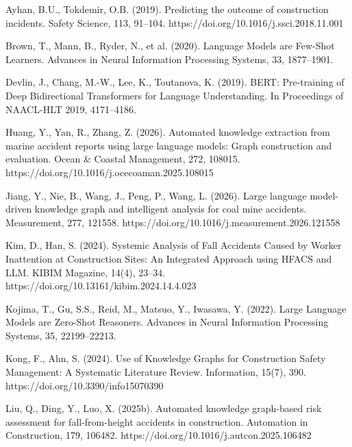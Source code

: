 \documentclass[11pt]{article}
\begin{document}
Ayhan, B.U., Tokdemir, O.B. (2019). Predicting the outcome of construction incidents. Safety Science, 113, 91--104. https:/\allowbreak{}/\allowbreak{}doi.\allowbreak{}org/\allowbreak{}10.\allowbreak{}1016/\allowbreak{}j.\allowbreak{}ssci.\allowbreak{}2018.\allowbreak{}11.\allowbreak{}001

Brown, T., Mann, B., Ryder, N., et al. (2020). Language Models are Few-Shot Learners. Advances in Neural Information Processing Systems, 33, 1877--1901.

Devlin, J., Chang, M.-W., Lee, K., Toutanova, K. (2019). BERT: Pre-training of Deep Bidirectional Transformers for Language Understanding. In Proceedings of NAACL-HLT 2019, 4171--4186.

Huang, Y., Yan, R., Zhang, Z. (2026). Automated knowledge extraction from marine accident reports using large language models: Graph construction and evaluation. Ocean \& Coastal Management, 272, 108015. https:/\allowbreak{}/\allowbreak{}doi.\allowbreak{}org/\allowbreak{}10.\allowbreak{}1016/\allowbreak{}j.\allowbreak{}ocecoaman.\allowbreak{}2025.\allowbreak{}108015

Jiang, Y., Nie, B., Wang, J., Peng, P., Wang, L. (2026). Large language model-driven knowledge graph and intelligent analysis for coal mine accidents. Measurement, 277, 121558. https:/\allowbreak{}/\allowbreak{}doi.\allowbreak{}org/\allowbreak{}10.\allowbreak{}1016/\allowbreak{}j.\allowbreak{}measurement.\allowbreak{}2026.\allowbreak{}121558

Kim, D., Han, S. (2024). Systemic Analysis of Fall Accidents Caused by Worker Inattention at Construction Sites: An Integrated Approach using HFACS and LLM. KIBIM Magazine, 14(4), 23--34. https:/\allowbreak{}/\allowbreak{}doi.\allowbreak{}org/\allowbreak{}10.\allowbreak{}13161/\allowbreak{}kibim.\allowbreak{}2024.\allowbreak{}14.\allowbreak{}4.\allowbreak{}023

Kojima, T., Gu, S.S., Reid, M., Matsuo, Y., Iwasawa, Y. (2022). Large Language Models are Zero-Shot Reasoners. Advances in Neural Information Processing Systems, 35, 22199--22213.

Kong, F., Ahn, S. (2024). Use of Knowledge Graphs for Construction Safety Management: A Systematic Literature Review. Information, 15(7), 390. https:/\allowbreak{}/\allowbreak{}doi.\allowbreak{}org/\allowbreak{}10.\allowbreak{}3390/\allowbreak{}info15070390

Liu, Q., Ding, Y., Luo, X. (2025b). Automated knowledge graph-based risk assessment for fall-from-height accidents in construction. Automation in Construction, 179, 106482. https:/\allowbreak{}/\allowbreak{}doi.\allowbreak{}org/\allowbreak{}10.\allowbreak{}1016/\allowbreak{}j.\allowbreak{}autcon.\allowbreak{}2025.\allowbreak{}106482
\end{document}
